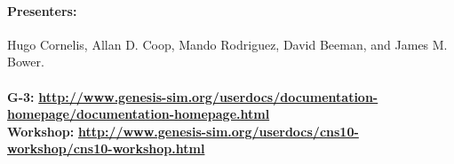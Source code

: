 \documentclass[12pt]{article}
\begin{document}
\paragraph*{Presenters:}
Hugo Cornelis, Allan D. Coop, Mando Rodriguez, David Beeman, and James M. Bower. \\

 \\
{\bf G-3:} {\scriptsize \href{http://www.genesis-sim.org/userdocs/documentation-homepage/documentation-homepage.html}{\bf http://www.genesis-sim.org/userdocs/documentation-homepage/documentation-homepage.html}} \\
{\bf Workshop:} {\scriptsize \href{http://www.genesis-sim.org/userdocs/cns10-workshop/cns10-workshop.html}{\bf http://www.genesis-sim.org/userdocs/cns10-workshop/cns10-workshop.html}}
\end{document}
